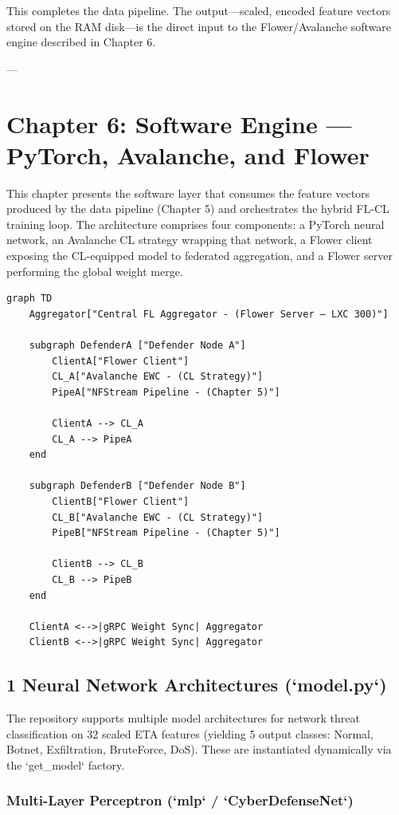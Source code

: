 \documentclass[conference]{IEEEtran}
\begin{document}
This completes the data pipeline. The output—scaled, encoded feature vectors stored on the RAM disk—is the direct input to the Flower/Avalanche software engine described in Chapter 6.

---


\section{Chapter 6: Software Engine — PyTorch, Avalanche, and Flower}

This chapter presents the software layer that consumes the feature vectors produced by the data pipeline (Chapter 5) and orchestrates the hybrid FL-CL training loop. The architecture comprises four components: a PyTorch neural network, an Avalanche CL strategy wrapping that network, a Flower client exposing the CL-equipped model to federated aggregation, and a Flower server performing the global weight merge.

\begin{verbatim}
graph TD
    Aggregator["Central FL Aggregator - (Flower Server – LXC 300)"]
    
    subgraph DefenderA ["Defender Node A"]
        ClientA["Flower Client"]
        CL_A["Avalanche EWC - (CL Strategy)"]
        PipeA["NFStream Pipeline - (Chapter 5)"]
        
        ClientA --> CL_A
        CL_A --> PipeA
    end

    subgraph DefenderB ["Defender Node B"]
        ClientB["Flower Client"]
        CL_B["Avalanche EWC - (CL Strategy)"]
        PipeB["NFStream Pipeline - (Chapter 5)"]
        
        ClientB --> CL_B
        CL_B --> PipeB
    end

    ClientA <-->|gRPC Weight Sync| Aggregator
    ClientB <-->|gRPC Weight Sync| Aggregator
\end{verbatim}


\subsection{1 Neural Network Architectures (`model.py`)}

The repository supports multiple model architectures for network threat classification on 32 scaled ETA features (yielding 5 output classes: Normal, Botnet, Exfiltration, BruteForce, DoS). These are instantiated dynamically via the `get\_model` factory.


\subsubsection{Multi-Layer Perceptron (`mlp` / `CyberDefenseNet`)}
\end{document}
